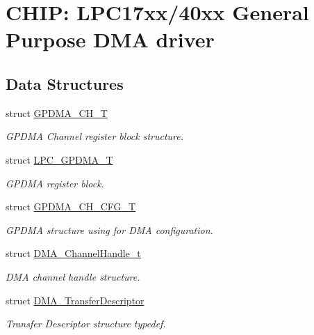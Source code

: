 \hypertarget{group__GPDMA__17XX__40XX}{\section{C\-H\-I\-P\-: L\-P\-C17xx/40xx General Purpose D\-M\-A driver}
\label{group__GPDMA__17XX__40XX}
}
\subsection*{Data Structures}
\begin{DoxyCompactItemize}
\item 
struct \hyperlink{structGPDMA__CH__T}{G\-P\-D\-M\-A\-\_\-\-C\-H\-\_\-\-T}
\begin{DoxyCompactList}\small\item\em G\-P\-D\-M\-A Channel register block structure. \end{DoxyCompactList}\item 
struct \hyperlink{structLPC__GPDMA__T}{L\-P\-C\-\_\-\-G\-P\-D\-M\-A\-\_\-\-T}
\begin{DoxyCompactList}\small\item\em G\-P\-D\-M\-A register block. \end{DoxyCompactList}\item 
struct \hyperlink{structGPDMA__CH__CFG__T}{G\-P\-D\-M\-A\-\_\-\-C\-H\-\_\-\-C\-F\-G\-\_\-\-T}
\begin{DoxyCompactList}\small\item\em G\-P\-D\-M\-A structure using for D\-M\-A configuration. \end{DoxyCompactList}\item 
struct \hyperlink{structDMA__ChannelHandle__t}{D\-M\-A\-\_\-\-Channel\-Handle\-\_\-t}
\begin{DoxyCompactList}\small\item\em D\-M\-A channel handle structure. \end{DoxyCompactList}\item 
struct \hyperlink{structDMA__TransferDescriptor}{D\-M\-A\-\_\-\-Transfer\-Descriptor}
\begin{DoxyCompactList}\small\item\em Transfer Descriptor structure typedef. \end{DoxyCompactList}\end{DoxyCompactItemize}
